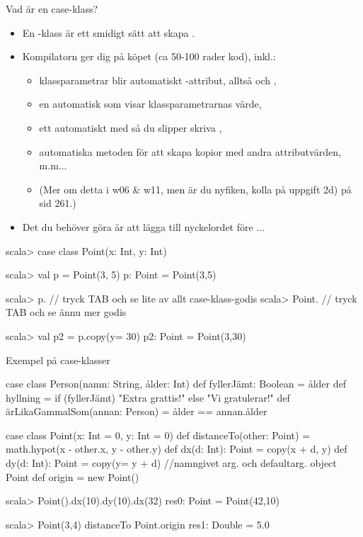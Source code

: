 \begin{Slide}{Vad är en case-klass?}\SlideFontSmall
\setlength{\leftmargini}{0pt}
\begin{itemize}
\item En -klass är ett smidigt sätt att skapa .
\item Kompilatorn ger dig  på köpet (ca 50-100 rader kod), inkl.:
\begin{itemize}\SlideFontTiny
\item klassparametrar blir automatiskt -attribut, alltså  och ,
\item en automatisk  som visar klassparametrarnas värde, 
\item ett automatiskt  med  så du slipper skriva ,
\item automatiska metoden  för att skapa kopior med andra attributvärden, m.m...
\item[] (Mer om detta i w06 \& w11, men är du nyfiken, kolla på uppgift 2d) på sid 261.)
\end{itemize}

\pause
\item Det  du behöver göra är att lägga till nyckelordet  före ...
\end{itemize}

\vspace{-0.5em}\begin{REPLnonum}
scala> case class Point(x: Int, y: Int)

scala> val p = Point(3, 5)
p: Point = Point(3,5)

scala> p.  // tryck TAB och se lite av allt case-klass-godis
scala> Point.  // tryck TAB och se ännu mer godis

scala> val p2 = p.copy(y= 30)
p2: Point = Point(3,30)
\end{REPLnonum}


\end{Slide}


\begin{Slide}{Exempel på case-klasser} 
\begin{Code}
case class Person(namn: String, ålder: Int) {
  def fyllerJämt: Boolean = ålder %
  def hyllning = if (fyllerJämt) "Extra grattis!" else "Vi gratulerar!"
  def ärLikaGammalSom(annan: Person) = ålder == annan.ålder
}

case class Point(x: Int = 0, y: Int = 0) {
  def distanceTo(other: Point) = math.hypot(x - other.x, y - other.y)
  def dx(d: Int): Point = copy(x + d, y)
  def dy(d: Int): Point = copy(y= y + d)  //namngivet arg. och defaultarg.
}
object Point { 
  def origin = new Point() 
}
\end{Code}

\begin{REPL}
scala> Point().dx(10).dy(10).dx(32)
res0: Point = Point(42,10)

scala> Point(3,4) distanceTo Point.origin
res1: Double = 5.0

\end{REPL}
\end{Slide}


